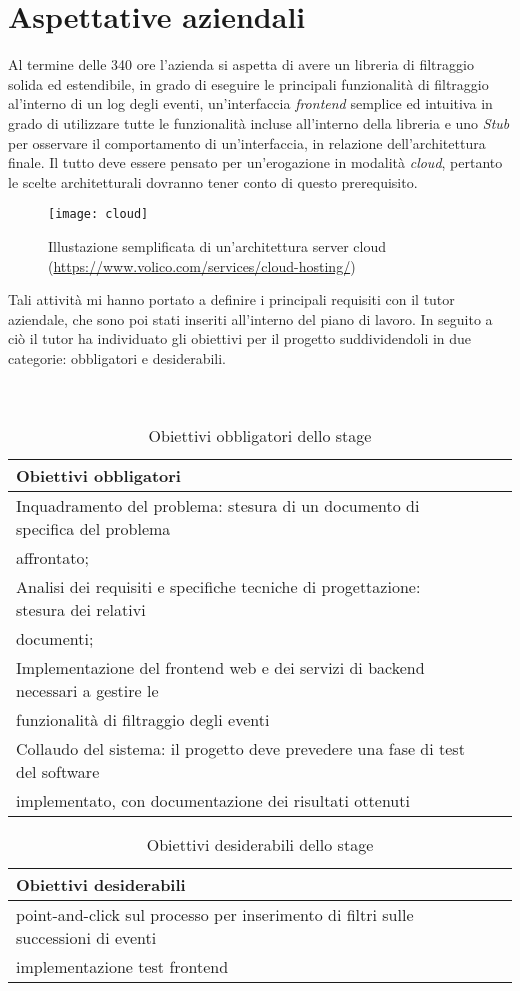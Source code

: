 \section{Aspettative aziendali}
Al termine delle 340 ore l'azienda si aspetta di avere un libreria di filtraggio solida ed estendibile, in grado di eseguire le principali funzionalità di filtraggio al'interno di un log degli eventi, un'interfaccia \textit{frontend} semplice ed intuitiva in grado di utilizzare tutte le funzionalità incluse all'interno della libreria e uno \textit{Stub} per osservare il comportamento di un'interfaccia, in relazione dell'architettura finale.
Il tutto deve essere pensato per un’erogazione in modalità \textit{cloud}, pertanto le scelte architetturali dovranno tener conto di questo prerequisito.
\begin{figure}[!h] 
	\centering 
	\texttt{[image: cloud]} 
	\caption{Illustazione semplificata di un'architettura server cloud (\url{https://www.volico.com/services/cloud-hosting/})}
\end{figure}
Tali attività mi hanno portato a definire i principali requisiti con il tutor aziendale, che sono poi stati inseriti all'interno del piano di lavoro. In seguito a ciò il tutor ha individuato gli obiettivi per il progetto suddividendoli in due categorie: obbligatori e desiderabili.\\
\\
\\
\begin{table}[!h]
	\caption{Obiettivi obbligatori dello stage}
\begin{tabularx}{\textwidth}{lXl}
	\hline\hline
	\textbf{Obiettivi obbligatori}\\
	\hline
	Inquadramento del problema: stesura di un documento di specifica del problema\\
	affrontato; &  \\
	\hline
	\hline
     Analisi dei requisiti e specifiche tecniche di progettazione: stesura dei relativi\\
     documenti; &  \\
	\hline
	\hline
	Implementazione del frontend web e dei servizi di backend necessari a gestire le\\
	funzionalità di filtraggio degli eventi &  \\
	\hline
	\hline
	Collaudo del sistema: il progetto deve prevedere una fase di test del software\\
	implementato, con documentazione dei risultati ottenuti &  \\
	\hline	
\end{tabularx}
\end{table}
\begin{table}[!h]
	\caption{Obiettivi desiderabili dello stage}
	\begin{tabularx}{\textwidth}{lXl}
		\hline\hline
		\textbf{Obiettivi desiderabili}\\
		\hline
		point-and-click sul processo per inserimento di filtri sulle successioni di eventi&  \\
		\hline
		\hline
		implementazione test frontend &  \\
		\hline
	\end{tabularx}
\end{table}
